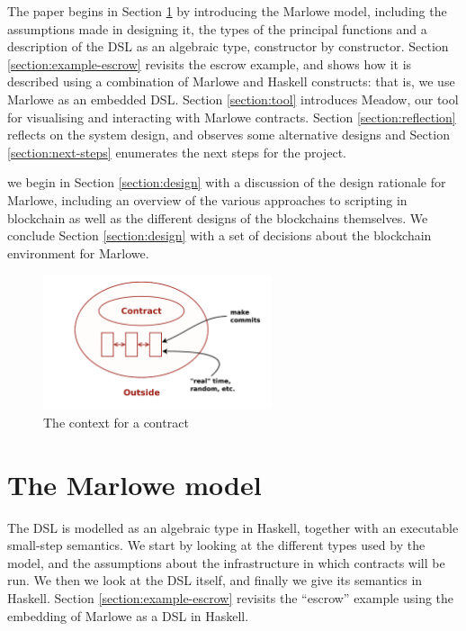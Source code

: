\documentclass[runningheads]{llncs}
\begin{document}
The paper begins in Section \ref{section:model} by introducing the Marlowe 
model, including the assumptions made in designing it, the types of the principal functions and a description of the DSL as an algebraic type, constructor by constructor. 
Section \ref{section:example-escrow} revisits the escrow example, and shows 
how it is described using a combination of Marlowe and Haskell constructs: that is, we use Marlowe as an embedded DSL. 
Section \ref{section:tool} introduces Meadow, our tool for visualising and interacting with Marlowe contracts.
Section \ref{section:reflection} reflects on the system design, and observes some alternative designs and Section 
\ref{section:next-steps} enumerates the next steps for the project.

we begin in Section \ref{section:design} with a discussion of the design rationale 
for Marlowe, including an overview of the various approaches to scripting in blockchain as well as the different designs 
of the blockchains themselves. We conclude Section \ref{section:design} with a set of decisions about the blockchain 
environment for Marlowe. 



\begin{figure}[t]
\begin{center}
\includegraphics[width=0.6\textwidth]{pix/context.png}
\caption{The context for a contract}
\label{fig:context}
\end{center}
\vspace*{-8mm}
\end{figure}


\section{The Marlowe model}
\label{section:model}

The DSL is modelled as an algebraic type in Haskell, together with an executable small-step semantics. 
We start by looking at the different types used by the model, and the assumptions about the infrastructure in which contracts will be run. We then we look at the  DSL itself, 
and finally we give its semantics in Haskell. Section 
\ref{section:example-escrow} revisits the ``escrow'' example using the embedding of Marlowe as a DSL in Haskell.
\end{document}
